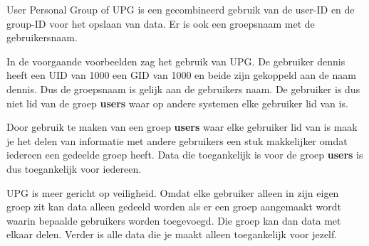 User Personal Group of UPG is een gecombineerd gebruik van de user-ID en de group-ID voor het opslaan van data. Er is ook een groepsnaam met de gebruikersnaam.

In de voorgaande voorbeelden zag het gebruik van UPG. De gebruiker dennis heeft een UID van 1000 een GID van 1000 en beide zijn gekoppeld aan de naam dennis. Dus de groepsnaam is gelijk aan de gebruikers naam. De gebruiker is dus niet lid van de groep \textbf{users} waar op andere systemen elke gebruiker lid van is.

Door gebruik te maken van een groep \textbf{users} waar elke gebruiker lid van is maak je het delen van informatie met andere gebruikers een stuk makkelijker omdat iedereen een gedeelde groep heeft. Data die toegankelijk is voor de groep \textbf{users} is dus toegankelijk voor iedereen.

UPG is meer gericht op veiligheid. Omdat elke gebruiker alleen in zijn eigen groep zit kan data alleen gedeeld worden als er een groep aangemaakt wordt waarin bepaalde gebruikers worden toegevoegd. Die groep kan dan data met elkaar delen. Verder is alle data die je maakt alleen toegankelijk voor jezelf.
